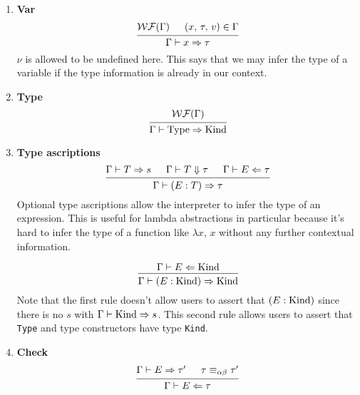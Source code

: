 \documentclass{article}
\begin{document}
\begin{enumerate}
\item \textbf{Var} \\
  \[
    \begin{prooftree}
      \hypo{\wf(\Gamma)}
      \hypo{(x, \, \tau, \, v) \in \Gamma}
      \infer2{\Gamma \vdash x \Rightarrow \tau}
    \end{prooftree}
  \]
  $\nu$ is allowed to be undefined here.
  This says that we may infer the type of a variable if the type information
  is already in our context.

\item \textbf{Type} \\
  \[
    \begin{prooftree}
      \hypo{\wf(\Gamma)}
      \infer1{\Gamma \vdash \Type \Rightarrow \Kind}
    \end{prooftree}
  \]


\item \textbf{Type ascriptions} \\
  \[
    \begin{prooftree}
      \hypo{\Gamma \vdash T \Rightarrow s}
      \hypo{\Gamma \vdash T \Downarrow \tau}
      \hypo{\Gamma \vdash E \Leftarrow \tau}
      \infer3{\Gamma \vdash (E : T) \Rightarrow \tau}
    \end{prooftree}
  \]
  Optional type ascriptions allow the interpreter to infer the type of an
  expression. This is useful for lambda abstractions in particular because it's
  hard to infer the type of a function like $\lambda x, \, x$ without any
  further contextual information.

  \[
    \begin{prooftree}
      \hypo{\Gamma \vdash E \Leftarrow \Kind}
      \infer1{\Gamma \vdash (E : \Kind) \Rightarrow \Kind}
    \end{prooftree}
  \]
  Note that the first rule doesn't allow users to assert that $(E : \operatorname{Kind})$
  since there is no $s$ with $\Gamma \vdash \operatorname{Kind} \Rightarrow s$.
  This second rule allows users to assert that \verb|Type| and type constructors
  have type \verb|Kind|.
  
\item \textbf{Check} \\
  \[
    \begin{prooftree}
      \hypo{\Gamma \vdash E \Rightarrow \tau'}
      \hypo{\tau \equiv_{\alpha \beta} \tau'}
      \infer2{\Gamma \vdash E \Leftarrow \tau}
    \end{prooftree}
  \]


\end{enumerate}
\end{document}
